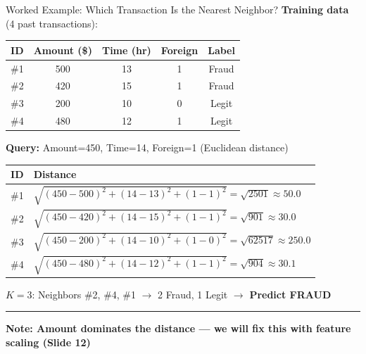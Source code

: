 \documentclass[8pt,aspectratio=169]{beamer}
\newcommand{\bottomnote}[1]{%
\vfill
\vspace{-2mm}
\textcolor{mllavender2}{\rule{\textwidth}{0.4pt}}
\vspace{1mm}
\footnotesize
\textbf{#1}
}
\newcommand{\highlight}[1]{\textcolor{mlorange}{\textbf{#1}}}
\begin{document}
\begin{frame}[t]{Worked Example: Which Transaction Is the Nearest Neighbor?}
\small
\textbf{Training data} (4 past transactions):

\vspace{1mm}
\footnotesize
\begin{tabular}{ccccc}
\toprule
\textbf{ID} & \textbf{Amount (\$)} & \textbf{Time (hr)} & \textbf{Foreign} & \textbf{Label} \\
\midrule
\#1 & 500 & 13 & 1 & Fraud \\
\#2 & 420 & 15 & 1 & Fraud \\
\#3 & 200 & 10 & 0 & Legit \\
\#4 & 480 & 12 & 1 & Legit \\
\bottomrule
\end{tabular}

\vspace{2mm}
\textbf{Query:} Amount=450, Time=14, Foreign=1 \quad (Euclidean distance)

\vspace{1mm}
\footnotesize
\begin{tabular}{cl}
\toprule
\textbf{ID} & \textbf{Distance} \\
\midrule
\#1 & $\sqrt{(450{-}500)^2 + (14{-}13)^2 + (1{-}1)^2} = \sqrt{2501} \approx 50.0$ \\
\#2 & $\sqrt{(450{-}420)^2 + (14{-}15)^2 + (1{-}1)^2} = \sqrt{901} \approx 30.0$ \\
\#3 & $\sqrt{(450{-}200)^2 + (14{-}10)^2 + (1{-}0)^2} = \sqrt{62517} \approx 250.0$ \\
\#4 & $\sqrt{(450{-}480)^2 + (14{-}12)^2 + (1{-}1)^2} = \sqrt{904} \approx 30.1$ \\
\bottomrule
\end{tabular}

\vspace{2mm}
\highlight{$K{=}3$}: Neighbors \#2, \#4, \#1 $\to$ 2 Fraud, 1 Legit $\to$ \textcolor{mlred}{\textbf{Predict FRAUD}}
\bottomnote{Note: Amount dominates the distance --- we will fix this with feature scaling (Slide 12)}
\end{frame}
\end{document}
